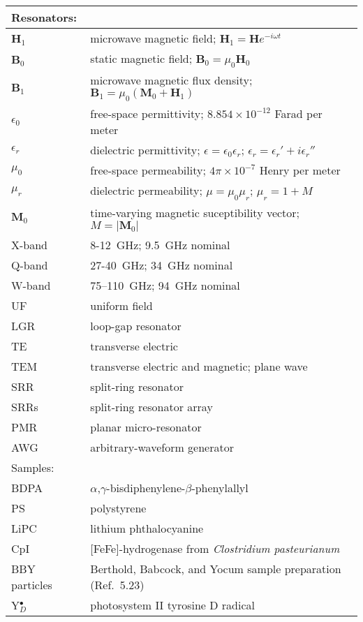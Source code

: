 \documentclass[11pt,DIV=14,a4paper,openany,twoside=semi,english,titlepage=true,BCOR=1cm]{scrbook}
\begin{document}
\begin{table}[ht!]
\begin{tabular}{ll}
\rowcolor{LightCyan}
Resonators:     & \\ \hline
\textbf{H}$_1$  & microwave magnetic field; $\mathbf{H}_1 = \mathbf{H}e^{-i\omega t}$  \\
\textbf{B}$_0$  & static magnetic field; $\mathbf{B}_0 = \mu_0 \mathbf{H}_0$ \\
\textbf{B}$_1$  & microwave magnetic flux density; $\mathbf{B}_1 = \mu_0 (\mathbf{M}_0 + \mathbf{H}_1)$\\
$\epsilon_0$    & free-space permittivity; $8.854\times10^{-12}$ Farad per meter\\
$\epsilon_r$    & dielectric permittivity; $\epsilon = \epsilon_0 \epsilon_r$; $\epsilon_r = \epsilon_r' + i \epsilon_r''$ \\
$\mu_0$         & free-space permeability; $4 \pi \times10^{-7}$ Henry per meter\\
$\mu_r$         & dielectric permeability; $\mu = \mu_0 \mu_r$; $\mu_r = 1 + M$ \\
$\mathbf{M}_0$  & time-varying magnetic suceptibility vector; $M = |\mathbf{M}_0|$ \\
X-band          & 8-12~GHz; 9.5~GHz nominal \\ 
Q-band          & 27-40~GHz; 34~GHz nominal \\ 
W-band          & 75–110~GHz; 94~GHz nominal \\  
UF              & uniform field \\ 
LGR             & loop-gap resonator \\ 
TE              & transverse electric \\
TEM             & transverse electric and magnetic; plane wave \\
SRR             & split-ring resonator \\
SRRs            & split-ring resonator array \\
PMR             & planar micro-resonator \\ 
AWG             & arbitrary-waveform generator \\ \hline \hline
\rowcolor{LightCyan}
Samples:        & \\ \hline
BDPA            & $\alpha$,$\gamma$-bisdiphenylene-$\beta$-phenylallyl \\
PS              & polystyrene \\
LiPC            & lithium phthalocyanine \\
CpI             & [FeFe]-hydrogenase from \textit{Clostridium pasteurianum} \\
BBY particles   & Berthold, Babcock, and Yocum sample preparation (Ref.~5.23) $\qquad$\\
Y$_D^\bullet$   & photosystem II tyrosine D radical \\ \hline \hline
\end{tabular}
\end{table}
\vfill	
\end{document}
